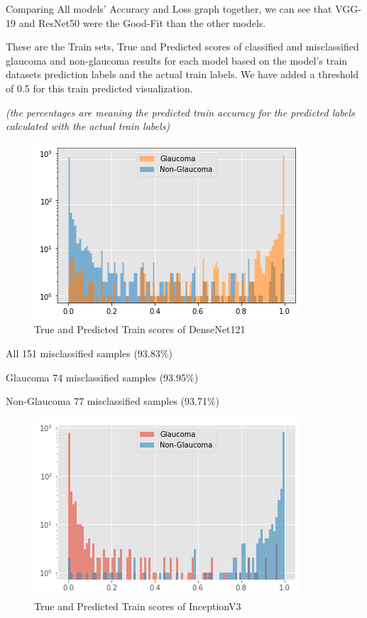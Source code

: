 \documentclass[conference]{IEEEtran}
\begin{document}
\noindent Comparing All models' Accuracy and Loss graph together, we can see that VGG-19 and ResNet50 were the Good-Fit than the other models.

\noindent These are the Train sets, True and Predicted scores of classified and misclassified glaucoma and non-glaucoma results for each model based on the model’s train datasets prediction labels and the actual train labels. We have added a threshold of 0.5 for this train predicted visualization.

\noindent\textit{(the percentages are meaning the predicted train accuracy for the predicted labels calculated with the actual train labels)}

\vspace{5mm}
\begin{figure}[hbt!]
\centering
\includegraphics[scale=0.5]{fig-36.png}
\caption{True and Predicted Train scores of DenseNet121}
\label{fig:x True and Predicted Train scores of DenseNet121}
\end{figure}

\begin{center}
All  151 misclassified samples (93.83\%) 

Glaucoma  74 misclassified samples (93.95\%)

Non-Glaucoma  77 misclassified samples (93.71\%)
\end{center}
\vspace{5mm}
\begin{figure}[hbt!]
\centering
\includegraphics[scale=0.5]{fig-37.png}
\caption{True and Predicted Train scores of InceptionV3}
\label{fig:x True and Predicted Train scores of InceptionV3}
\end{figure}
\end{document}
